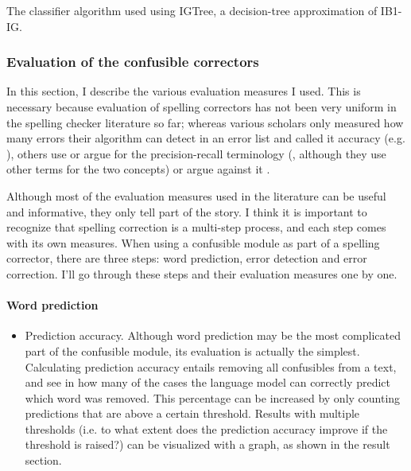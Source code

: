 \documentclass[12pt]{article}
\begin{document}
The classifier algorithm used using IGTree, a decision-tree approximation of IB1-IG.


\subsubsection{Evaluation of the confusible correctors}

In this section, I describe the various evaluation measures I used. This is necessary because evaluation of spelling correctors has not been very uniform in the spelling checker literature so far; whereas various scholars only measured how many errors their algorithm can detect in an error list and called it accuracy (e.g. \citealp{agirre98, bm00, tm02,vandelden04}), others use or argue for the precision-recall terminology (\citealp{reynaert08,pz84}, although they use other terms for the two concepts) or argue against it \citep{sp02}.\\\indent

Although most of the evaluation measures used in the literature can be useful and informative, they only tell part of the story. I think it is important to recognize that spelling correction is a multi-step process, and each step comes with its own measures. When using a confusible module as part of a spelling corrector, there are three steps: word prediction, error detection and error correction. I'll go through these steps and their evaluation measures one by one.

\paragraph{Word prediction}

\begin{itemize}
\item Prediction accuracy. Although word prediction may be the most complicated part of the confusible module, its evaluation is actually the simplest. Calculating prediction accuracy entails removing all confusibles from a text, and see in how many of the cases the language model can correctly predict which word was removed. This percentage can be increased by only counting predictions that are above a certain threshold. Results with multiple thresholds (i.e. to what extent does the prediction accuracy improve if the threshold is raised?) can be visualized with a graph, as shown in the result section.
\end{itemize}
\end{document}
